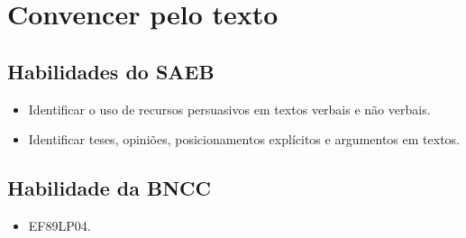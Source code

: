 \chapter{Convencer pelo texto}



\section{Habilidades do SAEB}

\begin{itemize}
\item
  Identificar o uso de recursos persuasivos em textos verbais e não
  verbais.
\item
  Identificar teses, opiniões, posicionamentos explícitos e argumentos
  em textos.
\end{itemize}

\section*{Habilidade da BNCC}

\begin{itemize}
\item EF89LP04.
\end{itemize}




